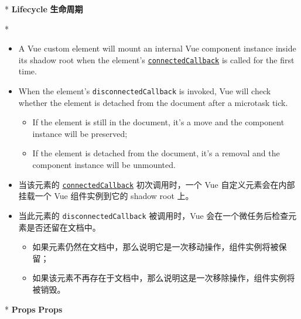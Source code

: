 \begin{paracol}{2} 
\switchcolumn[0]*
\textbf{Lifecycle}
\switchcolumn
\textbf{生命周期}
\end{paracol}


\begin{paracol}{2}  

\switchcolumn[0]*%
\begin{itemize}
\item
  A Vue custom element will mount an internal Vue component instance
  inside its shadow root when the element's
  \href{https://developer.mozilla.org/en-US/docs/Web/Web_Components/Using_custom_elements\#using_the_lifecycle_callbacks}{\texttt{connectedCallback}}
  is called for the first time.
\item
  When the element's \texttt{disconnectedCallback} is invoked, Vue will
  check whether the element is detached from the document after a
  microtask tick.
  \begin{itemize}
  \item
    If the element is still in the document, it's a move and the
    component instance will be preserved;
  \item
    If the element is detached from the document, it's a removal and the
    component instance will be unmounted.
  \end{itemize}
\end{itemize}
\switchcolumn
\begin{itemize}
\item
  当该元素的
  \href{https://developer.mozilla.org/en-US/docs/Web/Web_Components/Using_custom_elements\#using_the_lifecycle_callbacks}{\texttt{connectedCallback}}
  初次调用时，一个 Vue 自定义元素会在内部挂载一个 Vue 组件实例到它的
  shadow root 上。
\item
  当此元素的 \texttt{disconnectedCallback} 被调用时，Vue
  会在一个微任务后检查元素是否还留在文档中。
  \begin{itemize}
  \item
    如果元素仍然在文档中，那么说明它是一次移动操作，组件实例将被保留；
  \item
    如果该元素不再存在于文档中，那么说明这是一次移除操作，组件实例将被销毁。
  \end{itemize}
\end{itemize}
\switchcolumn[0]*%
\textbf{Props}
\switchcolumn
\textbf{Props}
\end{paracol}



